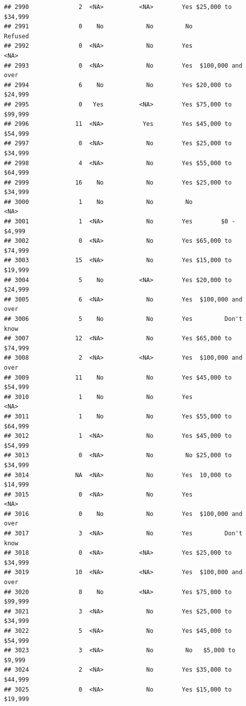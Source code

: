 \documentclass[man]{apa6}
\begin{document}
\begin{verbatim}
## 2990              2  <NA>          <NA>        Yes $25,000 to $34,999
## 2991              0    No            No         No            Refused
## 2992              0  <NA>            No        Yes               <NA>
## 2993              0  <NA>            No        Yes  $100,000 and over
## 2994              6    No            No        Yes $20,000 to $24,999
## 2995              0   Yes          <NA>        Yes $75,000 to $99,999
## 2996             11  <NA>           Yes        Yes $45,000 to $54,999
## 2997              0  <NA>            No        Yes $25,000 to $34,999
## 2998              4  <NA>            No        Yes $55,000 to $64,999
## 2999             16    No            No        Yes $25,000 to $34,999
## 3000              1    No            No         No               <NA>
## 3001              1  <NA>            No        Yes        $0 - $4,999
## 3002              0  <NA>            No        Yes $65,000 to $74,999
## 3003             15  <NA>            No        Yes $15,000 to $19,999
## 3004              5    No          <NA>        Yes $20,000 to $24,999
## 3005              6  <NA>            No        Yes  $100,000 and over
## 3006              5    No            No        Yes         Don't know
## 3007             12  <NA>            No        Yes $65,000 to $74,999
## 3008              2  <NA>          <NA>        Yes  $100,000 and over
## 3009             11    No            No        Yes $45,000 to $54,999
## 3010              1    No            No        Yes               <NA>
## 3011              1    No            No        Yes $55,000 to $64,999
## 3012              1  <NA>            No        Yes $45,000 to $54,999
## 3013              0  <NA>            No         No $25,000 to $34,999
## 3014             NA  <NA>            No        Yes  10,000 to $14,999
## 3015              0  <NA>            No        Yes               <NA>
## 3016              0    No            No        Yes  $100,000 and over
## 3017              3  <NA>            No        Yes         Don't know
## 3018              0  <NA>          <NA>        Yes $25,000 to $34,999
## 3019             10  <NA>          <NA>        Yes  $100,000 and over
## 3020              8    No          <NA>        Yes $75,000 to $99,999
## 3021              3  <NA>            No        Yes $25,000 to $34,999
## 3022              5  <NA>            No        Yes $45,000 to $54,999
## 3023              3  <NA>            No         No   $5,000 to $9,999
## 3024              2  <NA>            No        Yes $35,000 to $44,999
## 3025              0  <NA>            No        Yes $15,000 to $19,999

\end{verbatim}
\end{document}
